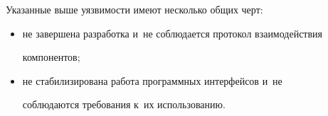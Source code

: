   


  


 \pagebreak


 


  Указанные выше уязвимости имеют несколько общих черт: 


  \begin{itemize}


\item не завершена разработка и~не соблюдается протокол взаимодействия 


компонентов;


\item не стабилизирована работа программных интерфейсов и~не 


соблюдаются требования к~их использованию.


\end{itemize}





